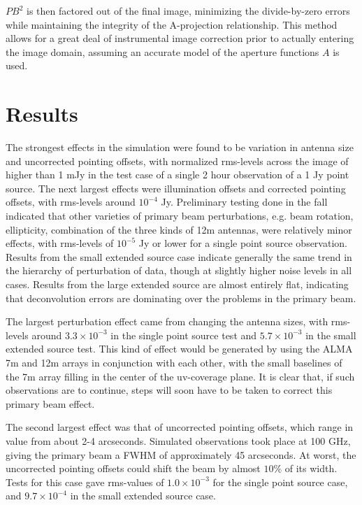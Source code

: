 \documentclass[11pt]{article}
\begin{document}
$PB^2$ is then factored out of the final image, minimizing the divide-by-zero 
errors while maintaining the integrity of the A-projection relationship. This 
method allows for a great deal of instrumental image correction prior to 
actually entering the image domain, assuming an accurate model of the aperture 
functions $A$ is used.

\section{Results}

The strongest effects in the simulation were found to be
variation in antenna size and uncorrected pointing offsets, with normalized 
rms-levels across the image of higher than 1 mJy in the test case of a single 2 
hour observation of a 1 Jy point source.  The next largest effects were 
illumination offsets and corrected pointing offsets, with rms-levels around 
$10^{-4}$ Jy.  Preliminary testing done in the fall indicated that other 
varieties of primary beam perturbations, e.g. beam rotation, ellipticity, 
combination of the three kinds of 12m antennas, were relatively minor effects, 
with rms-levels of $10^{-5}$ Jy or lower for a single point source observation.  
Results from the small extended source case indicate generally the same trend 
in the hierarchy of perturbation of data, though at slightly higher noise 
levels in all cases.  Results from the large extended source are almost 
entirely flat, indicating that deconvolution errors are dominating over the 
problems in the primary beam.

The largest perturbation effect came from changing the antenna sizes, with 
rms-levels around $ 3.3 \times 10^{-3}$ in the single point source test and 
$5.7 \times 10^{-3}$ in the small extended source test. This kind of effect 
would be generated by using the ALMA 7m and 12m arrays in conjunction with each 
other, with the small baselines of the 7m array filling in the center of the 
uv-coverage plane.  It is clear that, if such observations are to continue, 
steps will soon have to be taken to correct this primary beam effect.

The second largest effect was that of uncorrected pointing offsets, which
range in value from about 2-4 arcseconds. Simulated observations took place
at 100 GHz, giving the primary beam a FWHM of approximately 45 arcseconds.
At worst, the uncorrected pointing offsets could shift the beam by almost
$10\%$ of its width. Tests for this case gave rms-values of $1.0 \times 
10^{-3}$ for the single point source case, and $9.7 \times 10^{-4}$ in the 
small extended source case.
\end{document}
